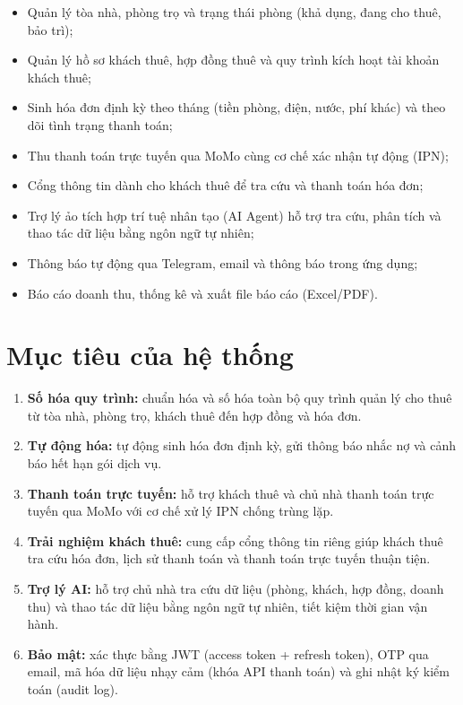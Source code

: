 \documentclass[12pt,a4paper]{report}
\begin{document}
\begin{itemize}[leftmargin=1.2em,itemsep=2pt]
  \item Quản lý tòa nhà, phòng trọ và trạng thái phòng (khả dụng, đang cho thuê, bảo trì);
  \item Quản lý hồ sơ khách thuê, hợp đồng thuê và quy trình kích hoạt tài khoản khách thuê;
  \item Sinh hóa đơn định kỳ theo tháng (tiền phòng, điện, nước, phí khác) và theo dõi tình trạng thanh toán;
  \item Thu thanh toán trực tuyến qua MoMo cùng cơ chế xác nhận tự động (IPN);
  \item Cổng thông tin dành cho khách thuê để tra cứu và thanh toán hóa đơn;
  \item Trợ lý ảo tích hợp trí tuệ nhân tạo (AI Agent) hỗ trợ tra cứu, phân tích và thao tác dữ liệu bằng ngôn ngữ tự nhiên;
  \item Thông báo tự động qua Telegram, email và thông báo trong ứng dụng;
  \item Báo cáo doanh thu, thống kê và xuất file báo cáo (Excel/PDF).
\end{itemize}

\section{Mục tiêu của hệ thống}

\begin{enumerate}[leftmargin=1.6em,itemsep=2pt]
  \item \textbf{Số hóa quy trình:} chuẩn hóa và số hóa toàn bộ quy trình quản lý cho thuê từ tòa nhà, phòng trọ, khách thuê đến hợp đồng và hóa đơn.
  \item \textbf{Tự động hóa:} tự động sinh hóa đơn định kỳ, gửi thông báo nhắc nợ và cảnh báo hết hạn gói dịch vụ.
  \item \textbf{Thanh toán trực tuyến:} hỗ trợ khách thuê và chủ nhà thanh toán trực tuyến qua MoMo với cơ chế xử lý IPN chống trùng lặp.
  \item \textbf{Trải nghiệm khách thuê:} cung cấp cổng thông tin riêng giúp khách thuê tra cứu hóa đơn, lịch sử thanh toán và thanh toán trực tuyến thuận tiện.
  \item \textbf{Trợ lý AI:} hỗ trợ chủ nhà tra cứu dữ liệu (phòng, khách, hợp đồng, doanh thu) và thao tác dữ liệu bằng ngôn ngữ tự nhiên, tiết kiệm thời gian vận hành.
  \item \textbf{Bảo mật:} xác thực bằng JWT (access token + refresh token), OTP qua email, mã hóa dữ liệu nhạy cảm (khóa API thanh toán) và ghi nhật ký kiểm toán (audit log).
\end{enumerate}
\end{document}
